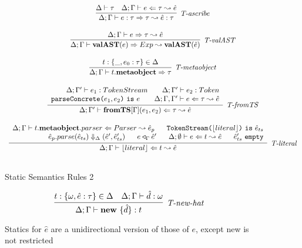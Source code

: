 \begin{figure}
\[\begin{array}{c}
\infer[\textit{T-ascribe}]
	{\Delta; \Gamma  \vdash  e:\tau \Rightarrow \tau \leadsto \hat{e}:\tau}
	{\Delta \vdash \tau & \Delta; \Gamma \vdash e \Leftarrow \tau \leadsto \hat{e} } \\[3ex]

\infer[\textit{T-valAST}]
        {\Delta; \Gamma \vdash \keyw{valAST}(e) \Rightarrow Exp \leadsto \keyw{valAST}(\hat{e}) }
	{\Delta; \Gamma \vdash e \Rightarrow \tau \leadsto \hat{e}} \\[3ex]

\infer[\textit{T-metaobject}]
        {\Delta; \Gamma \vdash t.\keyw{metaobject} \Rightarrow \tau   }
	{t:\{\_, e_0:\tau\} \in \Delta} \\[3ex]


\infer[\textit{T-fromTS}]
	  {\Delta; \Gamma' \vdash \keyw{fromTS}[\Gamma](e_1,e_2) \Leftarrow \tau \leadsto \hat{e} }
	  {\renewcommand{\arraystretch}{1}
	    \begin{array}{r}
	    \Delta;\Gamma' \vdash e_1:TokenStream ~~~~~~ \Delta;\Gamma' \vdash e_2:Token\\
            \texttt{parseConcrete(}e_1,e_2\texttt{)}\ \texttt{is}\ e ~~~~~~\Delta; \Gamma, \Gamma' \vdash e \Leftarrow \tau \leadsto \hat{e}
            \end{array}
       } \\[3ex]  

\infer[\textit{T-literal}]
	  {\Delta; \Gamma \vdash \lfloor literal \rfloor \Leftarrow t \leadsto \hat{e} }
	  {\renewcommand{\arraystretch}{1}
	    \begin{array}{r}
	    \Delta;\Gamma \vdash t.\keyw{metaobject}.parser\Leftarrow Parser \leadsto \hat{e}_p ~~~~~ \texttt{TokenStream(}\lfloor literal \rfloor \texttt{)}\ \texttt{is}\ \hat{e}_{ts}\\
            \hat{e}_p.parse(\hat{e}_{ts}) \Downarrow_{\Delta} (\hat{e}', \hat e_{ts}') ~~~~~  e \triangleleft_\Gamma \hat{e}'~~~~~ \Delta;\emptyset\vdash e\Leftarrow t \leadsto \hat{e} ~~~~~ \hat e_{ts}'\ \texttt{empty}
            \end{array}
       } \\[3ex]   
\end{array}
\]
\label{fig:statics2}
\caption{Static Semantics Rules 2}
\end{figure}

\begin{figure}
\centering
\[
\infer[\textit{T-new-hat}]
	{\Delta; \Gamma \vdash \keyw{new}\ \{ \hat d \} :  t }
	{ t:\{\omega, \hat e:\tau\} \in \Delta & \Delta;\Gamma \vdash \hat d : \omega}
\]
\caption{Statics for $\hat e$ are a unidirectional version of those of $e$, except new is not restricted}
\label{fig:staticsHat}
\end{figure}

